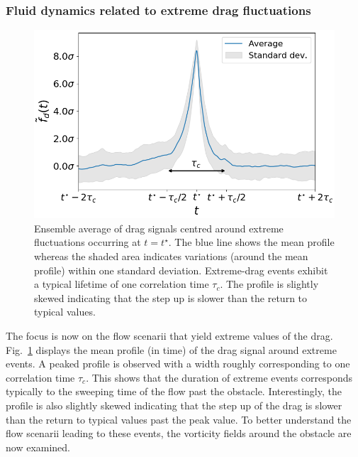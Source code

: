 \documentclass{jfm}
\newcommand{\EL}[1]{{\color{myred}{#1}}}
\begin{document}
\subsubsection{Fluid dynamics related to extreme drag fluctuations}
\label{sec:dynamical_aspects}

\begin{figure}
	\centering
	\includegraphics[width=.7\linewidth]{timeseries_extremes/timeseries_extremes.png}
	\caption{\label{fig:timeseries_extremes} Ensemble average of drag signals centred around extreme fluctuations occurring  at $t=t^{\star}$. The blue line shows the mean profile whereas the shaded area indicates variations (around the mean profile) within one standard deviation. Extreme-drag events exhibit a typical lifetime of one correlation time $\tau_c$. The profile is slightly skewed indicating that the step up is slower than the return to typical values.}
\end{figure}

%
The focus is now on the flow scenarii that yield extreme values of the drag.
Fig.~\ref{fig:timeseries_extremes} displays the mean profile (in time) of the drag signal around extreme events. A peaked profile is observed with a width roughly corresponding to one correlation time $\tau_c$. This shows that the duration of extreme events corresponds typically to the sweeping time of the flow past the obstacle.
Interestingly, the profile is also slightly skewed indicating that the step up of the drag is slower than the return to typical values past the peak value.
\EL{This asymmetry (under time reversal) is closely linked to the symmetry breaking in what happens before and after the obstacle.}
To better understand the flow scenarii leading to these events, the vorticity fields around the obstacle are now examined.
\end{document}
